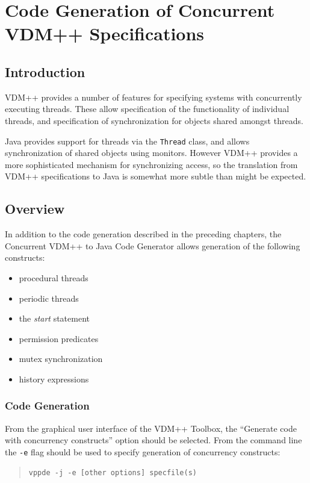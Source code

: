 \documentclass[\pformat,11pt]{article}
\newcommand{\ToolboxName}{VDM++ Toolbox}
\newcommand{\cg}{VDM++ to Java Code Generator}
\newcommand{\ccg}{Concurrent \cg}
\begin{document}
\newpage
\section{Code Generation of Concurrent VDM++ Specifications}\label{concmain}

\subsection{Introduction}

VDM++ provides a number of features for specifying systems with
concurrently executing threads. These allow specification of the
functionality of individual threads, and specification of
synchronization for objects shared amongst threads. 

Java provides support for threads via the \texttt{Thread} class, and
allows synchronization of shared objects using monitors. However VDM++
provides a more sophisticated mechanism for synchronizing access, so
the translation from VDM++ specifications to Java is somewhat more
subtle than might be expected.

\subsection{Overview}
In addition to the code generation described in the preceding
chapters, the \ccg{} allows generation of the following constructs:
\begin{itemize}
\item procedural threads
\item periodic threads
\item the \textit{start} statement
\item permission predicates
\item mutex synchronization
\item history expressions
\end{itemize}

\subsubsection{Code Generation}
From the graphical user interface of the \ToolboxName, the ``Generate
code with concurrency constructs'' option should be selected.
From the command line the \texttt{-e} flag should be used to specify
generation of concurrency constructs:
\begin{quote}
\begin{verbatim}
vppde -j -e [other options] specfile(s)
\end{verbatim}
\end{quote}
\end{document}
